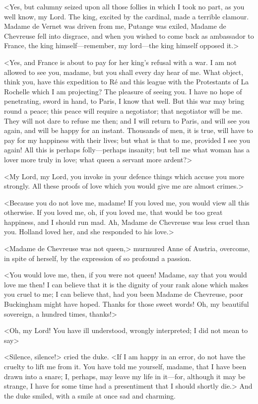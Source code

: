 <Yes, but calumny seized upon all those follies in which I took no part, as you well know, my Lord. The king, excited by the cardinal, made a terrible clamour. Madame de Vernet was driven from me, Putange was exiled, Madame de Chevreuse fell into disgrace, and when you wished to come back as ambassador to France, the king himself---remember, my lord---the king himself opposed it.> 

<Yes, and France is about to pay for her king's refusal with a war. I am not allowed to see you, madame, but you shall every day hear of me. What object, think you, have this expedition to Ré and this league with the Protestants of La Rochelle which I am projecting? The pleasure of seeing you. I have no hope of penetrating, sword in hand, to Paris, I know that well. But this war may bring round a peace; this peace will require a negotiator; that negotiator will be me. They will not dare to refuse me then; and I will return to Paris, and will see you again, and will be happy for an instant. Thousands of men, it is true, will have to pay for my happiness with their lives; but what is that to me, provided I see you again! All this is perhaps folly---perhaps insanity; but tell me what woman has a lover more truly in love; what queen a servant more ardent?> 

<My Lord, my Lord, you invoke in your defence things which accuse you more strongly. All these proofs of love which you would give me are almost crimes.> 

<Because you do not love me, madame! If you loved me, you would view all this otherwise. If you loved me, oh, if you loved me, that would be too great happiness, and I should run mad. Ah, Madame de Chevreuse was less cruel than you. Holland loved her, and she responded to his love.> 

<Madame de Chevreuse was not queen,> murmured Anne of Austria, overcome, in spite of herself, by the expression of so profound a passion. 

<You would love me, then, if you were not queen! Madame, say that you would love me then! I can believe that it is the dignity of your rank alone which makes you cruel to me; I can believe that, had you been Madame de Chevreuse, poor Buckingham might have hoped. Thanks for those sweet words! Oh, my beautiful sovereign, a hundred times, thanks!> 

<Oh, my Lord! You have ill understood, wrongly interpreted; I did not mean to say\longdash> 

<Silence, silence!> cried the duke. <If I am happy in an error, do not have the cruelty to lift me from it. You have told me yourself, madame, that I have been drawn into a snare; I, perhaps, may leave my life in it---for, although it may be strange, I have for some time had a presentiment that I should shortly die.> And the duke smiled, with a smile at once sad and charming. 

